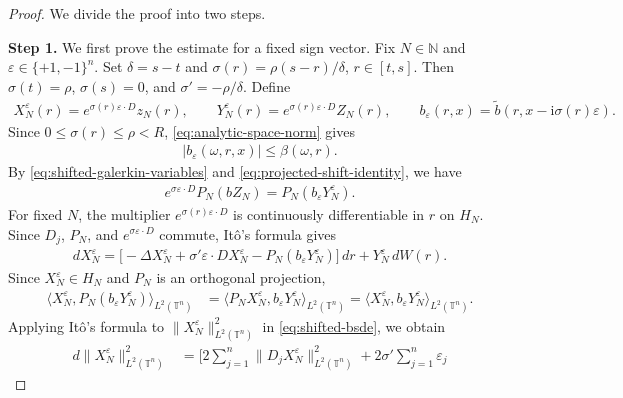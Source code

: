 \documentclass[print,wide]{draft}
\begin{document}
%
\begin{proof} We divide the proof into two steps.

\textbf{Step 1.} We first prove the estimate for a fixed sign vector.
Fix \(N\in\mathbb N\) and \(\varepsilon\in\{+1,-1\}^n\).
Set \(\delta=s-t\) and \(\sigma(r)=\rho(s-r)/\delta\), \(r\in[t,s]\).
Then \(\sigma(t)=\rho\), \(\sigma(s)=0\), and \(\sigma'=-\rho/\delta\).
Define
\begin{align}\label{eq:shifted-galerkin-variables}
X_N^\varepsilon(r)=e^{\sigma(r)\varepsilon\cdot D}z_N(r),
\qquad
Y_N^\varepsilon(r)=e^{\sigma(r)\varepsilon\cdot D}Z_N(r), \qquad b_\varepsilon(r,x)=\widetilde b(r,x-\mathrm{i}\sigma(r)\varepsilon).
\end{align}
Since \(0\leq\sigma(r)\leq\rho<R\),
\eqref{eq:analytic-space-norm} gives
\begin{align}\label{eq:shifted-coefficient-bound}
|b_\varepsilon(\omega,r,x)|\leq\beta(\omega,r).
\end{align}
By \eqref{eq:shifted-galerkin-variables} and
\eqref{eq:projected-shift-identity}, we have
\begin{align*}
e^{\sigma\varepsilon\cdot D}P_N(bZ_N)=P_N(b_\varepsilon Y_N^\varepsilon).
\end{align*}
For fixed $N$, the multiplier $e^{\sigma(r)\varepsilon\cdot D}$ is continuously differentiable in $r$ on $H_N$.
Since \(D_j\), \(P_N\), and \(e^{\sigma\varepsilon\cdot D}\) commute,
It\^o's formula gives
\begin{align}\label{eq:shifted-bsde}
dX_N^\varepsilon
=\bigl[-\Delta X_N^\varepsilon
+\sigma'\varepsilon\cdot DX_N^\varepsilon
-P_N(b_\varepsilon Y_N^\varepsilon)\bigr]\,dr
+Y_N^\varepsilon\,dW(r).
\end{align}
Since \(X_N^\varepsilon\in H_N\) and \(P_N\) is an orthogonal projection,
\begin{align*}
\bigl\langle X_N^\varepsilon,P_N(b_\varepsilon Y_N^\varepsilon)\bigr\rangle_{L^2(\mathbb{T}^n)}
&=\bigl\langle P_N X_N^\varepsilon,b_\varepsilon Y_N^\varepsilon\bigr\rangle_{L^2(\mathbb{T}^n)}
=\bigl\langle X_N^\varepsilon,b_\varepsilon Y_N^\varepsilon\bigr\rangle_{L^2(\mathbb{T}^n)}.
\end{align*}
Applying It\^o's formula to \(\lVert X_N^\varepsilon\rVert_{L^2(\mathbb{T}^n)}^2\)
in \eqref{eq:shifted-bsde}, we obtain
\begin{align}\label{9.13-eq1}
d\lVert X_N^\varepsilon\rVert_{L^2(\mathbb{T}^n)}^2
&=\Big[
2\sum_{j=1}^n\lVert D_jX_N^\varepsilon\rVert_{L^2(\mathbb{T}^n)}^2
+2\sigma'\sum_{j=1}^n\varepsilon_j

\end{align}
\end{proof}
\end{document}
